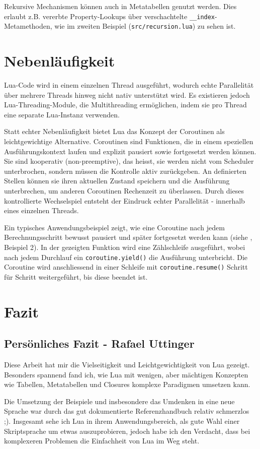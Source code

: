 \documentclass[11pt,a4paper]{article}
\begin{document}
Rekursive Mechanismen können auch in Metatabellen genutzt werden. 
Dies erlaubt z.B. vererbte Property-Lookups über verschachtelte \texttt{\_\_index}-Metamethoden, wie im zweiten Beispiel (\texttt{src/recursion.lua}) zu sehen ist.

\section*{Nebenläufigkeit}

Lua-Code wird in einem einzelnen Thread ausgeführt, wodurch echte Parallelität über mehrere Threads hinweg nicht nativ unterstützt wird. 
Es existieren jedoch Lua-Threading-Module, die Multithreading ermöglichen, indem sie pro Thread eine separate Lua-Instanz verwenden.

Statt echter Nebenläufigkeit bietet Lua das Konzept der Coroutinen als leichtgewichtige Alternative. 
Coroutinen sind Funktionen, die in einem speziellen Ausführungskontext laufen und explizit pausiert sowie fortgesetzt werden können. 
Sie sind kooperativ (non-preemptive), das heisst, sie werden nicht vom Scheduler unterbrochen, sondern müssen die Kontrolle aktiv zurückgeben. 
An definierten Stellen können sie ihren aktuellen Zustand speichern und die Ausführung unterbrechen, um anderen Coroutinen Rechenzeit zu überlassen. 
Durch dieses kontrollierte Wechselspiel entsteht der Eindruck echter Parallelität - innerhalb eines einzelnen Threads.

Ein typisches Anwendungsbeispiel zeigt, wie eine Coroutine nach jedem Berechnungsschritt bewusst pausiert und später fortgesetzt werden kann (siehe , Beispiel 2). 
In der gezeigten Funktion wird eine Zählschleife ausgeführt, wobei nach jedem Durchlauf ein \lstinline|coroutine.yield()| die Ausführung unterbricht. 
Die Coroutine wird anschliessend in einer Schleife mit \lstinline|coroutine.resume()| Schritt für Schritt weitergeführt, bis diese beendet ist.

\section*{Fazit}

\subsection*{Persönliches Fazit - Rafael Uttinger}
Diese Arbeit hat mir die Vielseitigkeit und Leichtgewichtigkeit von Lua gezeigt. 
Besonders spannend fand ich, wie Lua mit wenigen, aber mächtigen Konzepten wie Tabellen, Metatabellen und Closures komplexe Paradigmen umsetzen kann. 

Die Umsetzung der Beispiele und insbesondere das Umdenken in eine neue Sprache war durch das gut dokumentierte Referenzhandbuch relativ schmerzlos ;). 
Insgesamt sehe ich Lua in ihrem Anwendungsbereich, als gute Wahl einer Skriptsprache um etwas auszuprobieren, jedoch habe ich den Verdacht, 
dass bei komplexeren Problemen die Einfachheit von Lua im Weg steht. 
\end{document}
